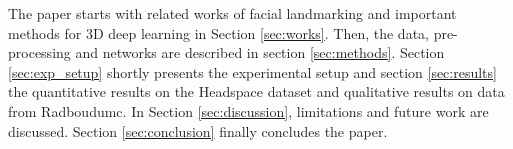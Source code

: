 The paper starts with related works of facial landmarking and important methods for 3D deep learning in Section \ref{sec:works}. Then, the data, pre-processing and networks are described in section \ref{sec:methods}. Section \ref{sec:exp_setup} shortly presents the experimental setup and section \ref{sec:results} the quantitative results on the Headspace dataset and qualitative results on data from Radboudumc. In Section \ref{sec:discussion}, limitations and future work are discussed. Section \ref{sec:conclusion} finally concludes the paper.


